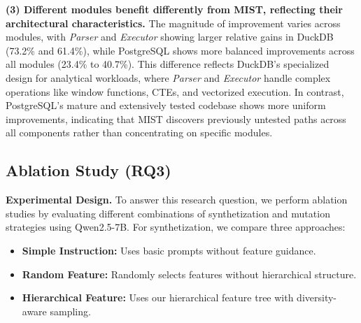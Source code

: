 \textbf{(3) Different modules benefit differently from MIST, reflecting their architectural characteristics.} The magnitude of improvement varies across modules, with \textit{Parser} and \textit{Executor} showing larger relative gains in DuckDB (73.2\% and 61.4\%), while PostgreSQL shows more balanced improvements across all modules (23.4\% to 40.7\%). This difference reflects DuckDB's specialized design for analytical workloads, where \textit{Parser} and \textit{Executor} handle complex operations like window functions, CTEs, and vectorized execution. In contrast, PostgreSQL's mature and extensively tested codebase shows more uniform improvements, indicating that MIST discovers previously untested paths across all components rather than concentrating on specific modules.


\noindent
{}



\subsection{Ablation Study (RQ3)}

\noindent \textbf{Experimental Design.} To answer this research question, we perform ablation studies by evaluating different combinations of synthetization and mutation strategies using Qwen2.5-7B. For synthetization, we compare three approaches:

\begin{itemize}
\item \textbf{Simple Instruction:} Uses basic prompts without feature guidance.
\item \textbf{Random Feature:} Randomly selects features without hierarchical structure.
\item \textbf{Hierarchical Feature:} Uses our hierarchical feature tree with diversity-aware sampling.
\end{itemize}

